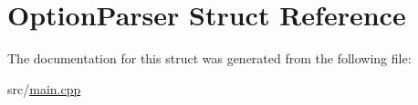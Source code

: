 \hypertarget{struct_option_parser}{}\section{Option\+Parser Struct Reference}
\label{struct_option_parser}


The documentation for this struct was generated from the following file\+:\begin{DoxyCompactItemize}
\item 
src/\hyperlink{main_8cpp}{main.\+cpp}\end{DoxyCompactItemize}
